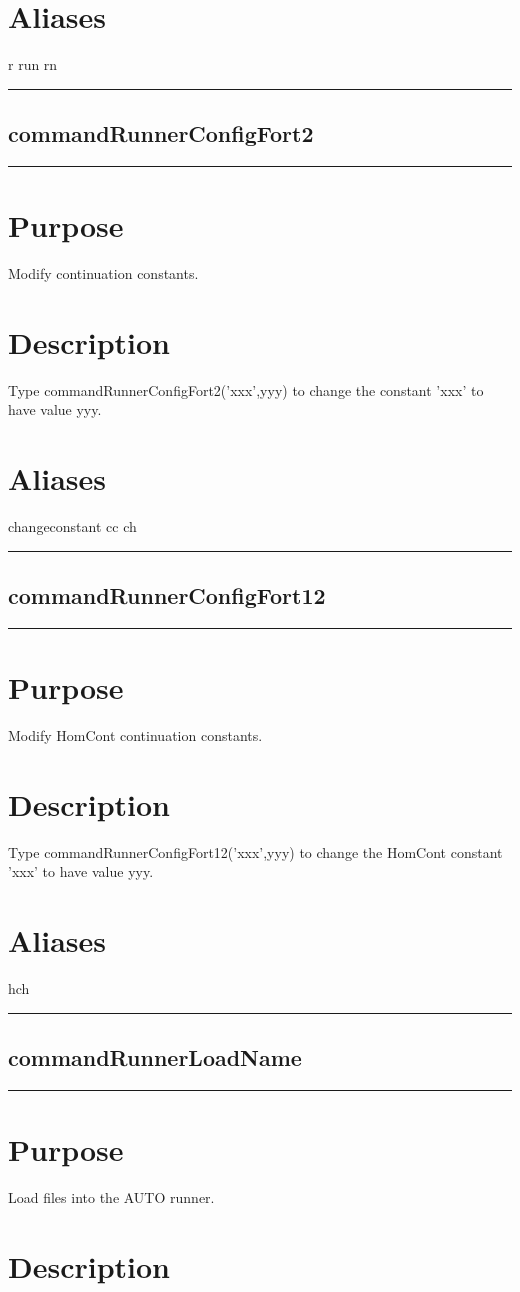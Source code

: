 \documentclass[12pt]{report}
\begin{document}
\begin{minipage}{6in}
    \section*{Aliases}
r run rn \medskip\hrule\end{minipage}\subsection{commandRunnerConfigFort2} \label{sec:clui_ref_commandRunnerConfigFort2}\begin{minipage}{6in}\hrule\medskip\section*{Purpose}
Modify continuation constants.\section*{Description}

    Type commandRunnerConfigFort2('xxx',yyy) to change the constant 'xxx' to have
    value yyy.
    \section*{Aliases}
changeconstant cc ch \medskip\hrule\end{minipage}\subsection{commandRunnerConfigFort12} \label{sec:clui_ref_commandRunnerConfigFort12}\begin{minipage}{6in}\hrule\medskip\section*{Purpose}
Modify HomCont continuation constants.\section*{Description}

    Type commandRunnerConfigFort12('xxx',yyy) to change the HomCont constant 'xxx' to have
    value yyy.
    \section*{Aliases}
hch \medskip\hrule\end{minipage}\subsection{commandRunnerLoadName} \label{sec:clui_ref_commandRunnerLoadName}\begin{minipage}{6in}\hrule\medskip\section*{Purpose}
Load files into the AUTO runner.\section*{Description}


\end{minipage}
\end{document}
